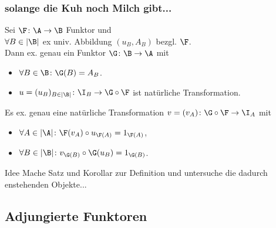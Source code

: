 \begin{frame}[fragile]
  \frametitle{solange die Kuh noch Milch gibt...}
  \begin{thm*}
    Sei $\F \colon \A \to \B$ Funktor und \\
    $\forall B \in |\B|$ ex univ. Abbildung $(u_B, A_B)$ bezgl. $\F$. \\
    Dann ex. genau ein Funktor $\G \colon \B \to \A$ mit
    \begin{itemize}
      \item $\forall B \in \B \colon \G(B) = A_B$.
      \item $u = (u_B)_{B \in |\B|} \colon \I_B \to \G \circ \F$ ist natürliche Transformation.
    \end{itemize}
  \end{thm*}
\pause
  \begin{kor*}
    Es ex. genau eine nat\"urliche Transformation $v = (v_A) \colon \G \circ \F \to \I_A$ mit
    \begin{itemize}
      \item $\forall A \in |\A| \colon \F(v_A) \circ u_{\F(A)} = 1_{\F(A)}$,
      \item $\forall B \in |\B| \colon v_{\G(B)} \circ \G(u_B) = 1_{\G(B)}$.
    \end{itemize}
  \end{kor*}
\vspace{1em}
\pause
  \begin{block}{Idee}
Mache Satz und Korollar zur Definition und untersuche die dadurch enstehenden Objekte...
  \end{block}

\end{frame}
\subsection{Adjungierte Funktoren}

